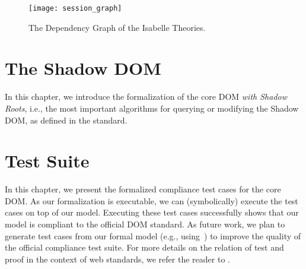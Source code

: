 \documentclass[10pt,DIV16,a4paper,abstract=true,twoside=semi,openright]
{scrreprt}
\begin{document}
\begin{figure}
  \centering
  \texttt{[image: session\_graph]}
  \caption{The Dependency Graph of the Isabelle Theories.\label{fig:session-graph}}
\end{figure}

\clearpage

\chapter{The Shadow DOM}
\label{cha:dom}
In this chapter, we introduce the formalization of the core DOM
\emph{with Shadow Roots}, i.e., the most important algorithms for
querying or modifying the Shadow DOM, as defined in the standard.






\chapter{Test Suite}
\label{cha:tests}
In this chapter, we present the formalized compliance test cases for
the core DOM. As our formalization is executable, we can
(symbolically) execute the test cases on top of our model. Executing
these test cases successfully shows that our model is compliant to the
official DOM standard. As future work, we plan to generate test cases
from our formal model (e.g.,
using~\cite{brucker.ea:interactive:2005,brucker.ea:theorem-prover:2012})
to improve the quality of the official compliance test suite. For more
details on the relation of test and proof in the context of web
standards, we refer the reader to
\cite{brucker.ea:standard-compliance-testing:2018}.











{\small
  
  
}
\end{document}
